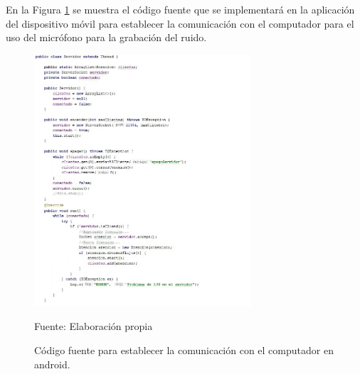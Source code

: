 En la Figura \ref{fig:figura3.66} se muestra el código fuente que se implementará en la aplicación del dispositivo móvil para establecer la comunicación con el computador para el uso del micrófono para la grabación del ruido.
\begin{figure}[H]
\captionsetup{justification=centering}
\begin{center}
\includegraphics[width=0.72\textwidth]{Imagenes/Cap3/image066}
\end{center}
\begin{center}
\vskip -0.5cm
\caption{\small{Código fuente para establecer la comunicación con el computador en android.}}
\label{fig:figura3.66}
{\small{Fuente: Elaboración propia}}
\end{center}
\end{figure}


